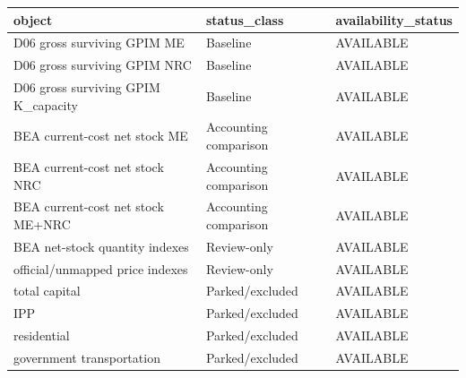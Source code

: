 
\begin{tabular}{lll}
\toprule
object & status\_class & availability\_status\\
\midrule
D06 gross surviving GPIM ME & Baseline & AVAILABLE\\
D06 gross surviving GPIM NRC & Baseline & AVAILABLE\\
D06 gross surviving GPIM K\_capacity & Baseline & AVAILABLE\\
BEA current-cost net stock ME & Accounting comparison & AVAILABLE\\
BEA current-cost net stock NRC & Accounting comparison & AVAILABLE\\
\addlinespace
BEA current-cost net stock ME+NRC & Accounting comparison & AVAILABLE\\
BEA net-stock quantity indexes & Review-only & AVAILABLE\\
official/unmapped price indexes & Review-only & AVAILABLE\\
total capital & Parked/excluded & AVAILABLE\\
IPP & Parked/excluded & AVAILABLE\\
\addlinespace
residential & Parked/excluded & AVAILABLE\\
government transportation & Parked/excluded & AVAILABLE\\
\bottomrule
\end{tabular}
